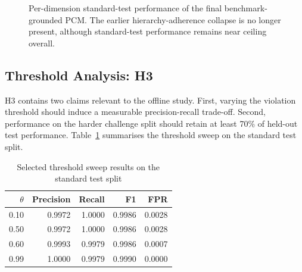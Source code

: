 \documentclass[12pt,a4paper]{article}
\begin{document}
\begin{figure}[htbp]
\centering
{}
\caption{Per-dimension standard-test performance of the final benchmark-grounded PCM. The earlier hierarchy-adherence collapse is no longer present, although standard-test performance remains near ceiling overall.}
\label{fig:per_dimension_final}
\end{figure}
 
\subsection{Threshold Analysis: H3}
\label{sec:threshold}
 
H3 contains two claims relevant to the offline study. First, varying the
violation threshold should induce a measurable precision-recall trade-off.
Second, performance on the harder challenge split should retain at least
70\% of held-out test performance. Table~\ref{tab:threshold_final} summarises
the threshold sweep on the standard test split.
 
\begin{table}[h]
\centering\small
\caption{Selected threshold sweep results on the standard test split}
\label{tab:threshold_final}
\begin{tabular}{@{} r r r r r @{}}
\toprule
$\theta$ & \textbf{Precision} & \textbf{Recall} &
\textbf{F1} & \textbf{FPR} \\
\midrule
0.10 & 0.9972 & 1.0000 & 0.9986 & 0.0028 \\
0.50 & 0.9972 & 1.0000 & 0.9986 & 0.0028 \\
0.60 & 0.9993 & 0.9979 & 0.9986 & 0.0007 \\
0.99 & 1.0000 & 0.9979 & 0.9990 & 0.0000 \\
\bottomrule
\end{tabular}
\end{table}
 
\end{document}
